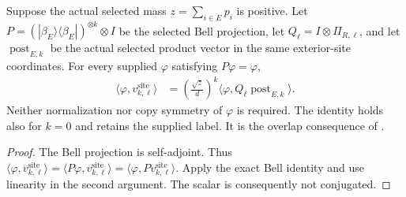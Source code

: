 \begin{theorem}
    \label{thm:schmidt_bell_supplied_overlap}
    \leanok
    Suppose the actual selected mass $z=\sum_{i\in E}p_i$ is positive.
    Let $P=(|\beta_E\rangle\langle\beta_E|)^{\otimes k}\otimes I$
    be the selected Bell projection, let
    $Q_\ell=I\otimes\Pi_{R,\ell}$, and let
    $\operatorname{post}_{E,k}$ be the actual selected product vector
    in the same exterior-site coordinates.
    For every supplied $\varphi$ satisfying $P\varphi=\varphi$,
    \begin{align*}
        \langle\varphi,v^{\mathrm{site}}_{k,\ell}\rangle
        &=\left(\frac{\sqrt z}{d}\right)^k
        \langle\varphi,Q_\ell\operatorname{post}_{E,k}\rangle.
    \end{align*}
    Neither normalization nor copy symmetry of $\varphi$ is required.
    The identity holds also for $k=0$ and retains the supplied label.
    It is the overlap consequence of
    \cite[Section~8, lines~283--290 and~346--354]{OpenAI2026AreaLaw}.
\end{theorem}
\begin{proof}\leanok
    The Bell projection is self-adjoint. Thus
    $\langle\varphi,v^{\mathrm{site}}_{k,\ell}\rangle
    =\langle P\varphi,v^{\mathrm{site}}_{k,\ell}\rangle
    =\langle\varphi,Pv^{\mathrm{site}}_{k,\ell}\rangle$.
    Apply the exact Bell identity and use linearity in the second argument.
    The scalar is consequently not conjugated.
\end{proof}
